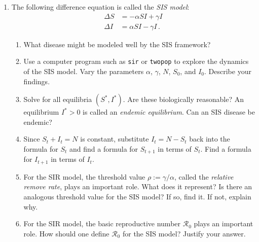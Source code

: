 \documentclass[12pt]{article}
\begin{document}
\begin{enumerate}
\item The following difference equation is called the \emph{SIS
  model}:
  \begin{align*}
    \Delta S&=-\alpha SI+\gamma I \\
    \Delta I&=\alpha SI-\gamma I\,.
  \end{align*}
  \begin{enumerate}
  \item What disease might be modeled well by the SIS framework?
  \item Use a computer program such as {\tt sir} or {\tt twopop} to
    explore the dynamics of the SIS model. Vary the parameters
    $\alpha$, $\gamma$, $N$, $S_0$, and $I_0$. Describe your findings.
  \item Solve for all equilibria $(S^*,I^*)$. Are these biologically
    reasonable? An equilibrium $I^*>0$ is called an \emph{endemic
      equilibrium}. Can an SIS disease be endemic?
  \item Since $S_t+I_t=N$ is constant, substitute $I_t=N-S_t$ back
    into the formula for $S_t$ and find a formula for $S_{t+1}$ in
    terms of $S_t$. Find a formula for $I_{t+1}$ in terms of $I_t$.
  \item For the SIR model, the threshold value $\rho:=\gamma/\alpha$,
    called the \emph{relative remove rate}, plays an important
    role. What does it represent? Is there an analogous threshold
    value for the SIS model? If so, find it. If not, explain why.
  \item For the SIR model, the basic reproductive number
    $\mathcal{R}_0$ plays an important role. How should one define
    $\mathcal{R}_0$ for the SIS model? Justify your answer. 
\end{enumerate}



\end{enumerate}
\end{document}
